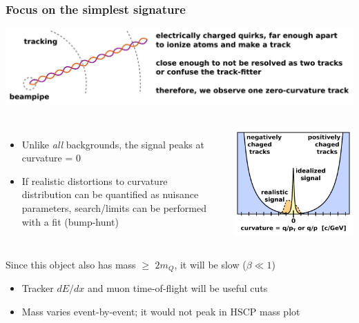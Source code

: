 \documentclass[compress]{beamer}
\begin{document}
\begin{frame}
\frametitle{Focus on the simplest signature}

\vspace{0.2 cm}
\includegraphics[width=\linewidth]{straight_track.pdf}

\begin{columns}
\begin{itemize}
\item Unlike {\it all} backgrounds, the signal peaks at curvature = 0
\item If realistic distortions to curvature distribution can be quantified as nuisance parameters, search/limits can be performed with a fit (bump-hunt)
\end{itemize}
\includegraphics[width=\linewidth]{curvature_distribution.pdf}
\end{columns}

Since this object also has mass $\ge$ $2m_Q$, it will be slow ($\beta \ll 1$)
\begin{itemize}
\item Tracker $dE/dx$ and muon time-of-flight will be useful cuts
\item Mass varies event-by-event; it would not peak in HSCP mass plot
\end{itemize}
\end{frame}
\end{document}
